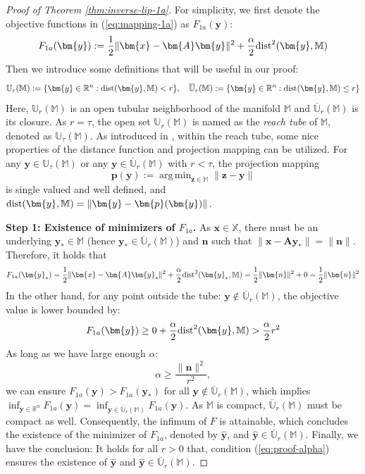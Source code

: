 \documentclass{amsart} %
\def\eqref#1{equation~\ref{#1}}
\def\vn{{\bm{n}}}
\def\vp{{\bm{p}}}
\def\vx{{\bm{x}}}
\def\vy{{\bm{y}}}
\def\vz{{\bm{z}}}
\def\mA{{\bm{A}}}
\def\sM{{\mathbb{M}}}
\def\sR{{\mathbb{R}}}
\def\sU{{\mathbb{U}}}
\def\sX{{\mathbb{X}}}
\DeclareMathOperator*{\argmin}{arg\,min}
\theoremstyle{definition}
\theoremstyle{remark}
\renewcommand{\eqref}[1]{\textup{(\ref{#1})}}
\begin{document}
\begin{proof}[Proof of Theorem \ref{thm:inverse-lip-1a}] 
For simplicity, we first denote the objective functions in \eqref{eq:mapping-1a} as $F_{1a}(\vy)$:
\[ 
F_{1a}(\vy):= \frac{1}{2}\|\vx - \mA \vy\|^2 + \frac{\alpha}{2} \textup{dist}^2(\vy,\sM) 
\]
Then we introduce some definitions that will be useful in our proof:
\[ \sU_r(\sM) := \{\vy \in \sR^n: \textup{dist}(\vy,\sM) < r\}, \quad \overline{\sU}_r(\sM) := \{\vy \in \sR^n: \textup{dist}(\vy,\sM) \leq r\} \]
Here, $\sU_r(\sM)$ is an open tubular neighborhood of the manifold $\sM$ and $\overline{\sU}_r(\sM)$ is its closure. As $r = \tau$, the open set $\sU_r(\sM)$ is named as the \textit{reach tube} of $\sM$, denoted as $\sU_{\tau}(\sM)$. As introduced in \cite{federer1959curvature}, within the reach tube, some nice properties of the distance function and projection mapping can be utilized. For any $\vy \in \sU_{\tau}(\sM)$ or any $\vy \in \overline{\sU}_r(\sM)$ with $r < \tau$, the projection mapping 
\[\vp(\vy):=\argmin_{\vz \in \sM} \|\vz-\vy\|\]
is single valued and well defined, and $\textup{dist}(\vy,\sM)=\|\vy - \vp(\vy)\|$. 

\textbf{Step 1: Existence of minimizers of $F_{1a}$.} As $\vx \in \sX$, there must be an underlying $\vy_\ast \in \sM$ (hence $\vy_\ast \in \overline{\sU}_r(\sM)$) and $\vn$ such that $\|\vx - \mA\vy_\ast\| = \|\vn\|$. Therefore, it holds that
\[F_{1a}(\vy_\ast) = \frac{1}{2}\|\vx - \mA \vy_\ast\|^2 + \frac{\alpha}{2} \textup{dist}^2(\vy_\ast,\sM) = \frac{1}{2} \|\vn\|^2 + 0 = \frac{1}{2} \|\vn\|^2 \]
In the other hand, for any point outside the tube: $\vy \not\in \overline{\sU}_r(\sM)$, the objective value is lower bounded by:
\[ F_{1a}(\vy) \geq 0 + \frac{\alpha}{2} \textup{dist}^2(\vy,\sM) > \frac{\alpha}{2} r^2 \]
As long as we have large enough $\alpha$:
\begin{equation}
\label{eq:proof-alpha}
\alpha \geq \frac{\|\vn\|^2}{r^2},
\end{equation}
we can ensure $F_{1a}(\vy)>F_{1a}(\vy_\ast)$ for all $\vy \not\in \overline{\sU}_r(\sM)$, which implies $\inf_{\vy\in\sR^n}F_{1a}(\vy)=\inf_{\vy \in \overline{\sU}_r(\sM)}F_{1a}(\vy)$. As $\sM$ is compact, $\overline{\sU}_r(\sM)$ must be compact as well. Consequently, the infimum of $F$ is attainable, which concludes the existence of the minimizer of $F_{1a}$, denoted by $\hat{\vy}$, and $\hat{\vy} \in \overline{\sU}_r(\sM)$. Finally, we have the conclusion: {It holds for all $r > 0$ that, condition \eqref{eq:proof-alpha} ensures the existence of $\hat{\vy}$ and $\hat{\vy} \in \overline{\sU}_r(\sM)$.}


\end{proof}
\end{document}
